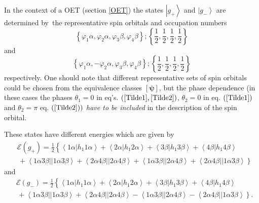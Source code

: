 \documentclass[aps,preprint]{revtex4}%
\begin{document}
In the context of a OET (section \ref{OET}) the states $\left\vert
g_{+}\right\rangle $ and $\left\vert g_{-}\right\rangle $ are determined
by\ the representative spin orbitals and occupation numbers
\begin{equation}
\left\{  \varphi_{1}\alpha,\varphi_{2}\alpha,\varphi_{3}\beta,\varphi_{4}%
\beta\right\}  ;\left\{  \frac{1}{2},\frac{1}{2},\frac{1}{2},\frac{1}%
{2}\right\}  \label{Tilde1}%
\end{equation}
and%
\begin{equation}
\left\{  \varphi_{1}\alpha,-\varphi_{2}\alpha,\varphi_{3}\beta,\varphi
_{4}\beta\right\}  ;\left\{  \frac{1}{2},\frac{1}{2},\frac{1}{2},\frac{1}%
{2}\right\}  \label{Tilde2}%
\end{equation}
respectively. One should note that different representative sets of spin
orbitals could be chosen from the equivalence classes $\left[
\boldsymbol{\psi}\right]  $, but the phase dependence (in these cases the
phases $\theta_{1}=0$ in eq's. $\left(  \ref{Tilde1},\ref{Tilde2}\right)  $,
$\theta_{2}=0$ in eq. $\left(  \ref{Tilde1}\right)  $ and $\theta_{2}=\pi$ eq.
$\left(  \ref{Tilde2}\right)  )$ \emph{have to be included} in the description
of the spin orbital.

These states have different energies which are given by
\begin{align}
&  \mathcal{E}\left(  g_{+}\right)  =\frac{1}{2}\left\{  \overset
{}{\left\langle 1\alpha\left\vert h_{1}1\alpha\right.  \right\rangle
+\left\langle 2\alpha\left\vert h_{1}2\alpha\right.  \right\rangle
+\left\langle 3\beta\left\vert h_{1}3\beta\right.  \right\rangle +\left\langle
4\beta\left\vert h_{1}4\beta\right.  \right\rangle }\right. \nonumber\\
&  \left.  \,+\left\langle 1\alpha3\beta\right\vert \left\vert 1\alpha
3\beta\right\rangle +\left\langle 2\alpha4\beta\right\vert \left\vert
2\alpha4\beta\right\rangle +\left\langle 1\alpha3\beta\right\vert \left\vert
2\alpha4\beta\right\rangle +\left\langle 2\alpha4\beta\right\vert \left\vert
1\alpha3\beta\right\rangle \overset{}{}\right\}  \label{E+}%
\end{align}
and
\begin{align}
&  \mathcal{E}\left(  g_{-}\right)  =\frac{1}{2}\left\{  \overset
{}{\left\langle 1\alpha\left\vert h_{1}1\alpha\right.  \right\rangle
+\left\langle 2\alpha\left\vert h_{1}2\alpha\right.  \right\rangle
+\left\langle 3\beta\left\vert h_{1}3\beta\right.  \right\rangle +\left\langle
4\beta\left\vert h_{1}4\beta\right.  \right\rangle }\right. \nonumber\\
&  \left.  \,+\left\langle 1\alpha3\beta\right\vert \left\vert 1\alpha
3\beta\right\rangle +\left\langle 2\alpha4\beta\right\vert \left\vert
2\alpha4\beta\right\rangle -\left\langle 1\alpha3\beta\right\vert \left\vert
2\alpha4\beta\right\rangle -\left\langle 2\alpha4\beta\right\vert \left\vert
1\alpha3\beta\right\rangle \overset{}{}\right\}  . \label{E-}%
\end{align}
\end{document}
